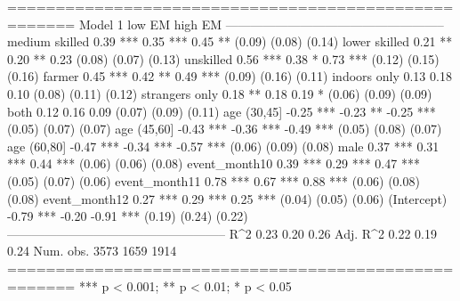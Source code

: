 
=====================================================
                Model 1      low EM       high EM    
-----------------------------------------------------
medium skilled     0.39 ***     0.35 ***     0.45 ** 
                  (0.09)       (0.08)       (0.14)   
lower skilled      0.21 **      0.20 **      0.23    
                  (0.08)       (0.07)       (0.13)   
unskilled          0.56 ***     0.38 *       0.73 ***
                  (0.12)       (0.15)       (0.16)   
farmer             0.45 ***     0.42 **      0.49 ***
                  (0.09)       (0.16)       (0.11)   
indoors only       0.13         0.18         0.10    
                  (0.08)       (0.11)       (0.12)   
strangers only     0.18 **      0.18         0.19 *  
                  (0.06)       (0.09)       (0.09)   
both               0.12         0.16         0.09    
                  (0.07)       (0.09)       (0.11)   
age (30,45]       -0.25 ***    -0.23 **     -0.25 ***
                  (0.05)       (0.07)       (0.07)   
age (45,60]       -0.43 ***    -0.36 ***    -0.49 ***
                  (0.05)       (0.08)       (0.07)   
age (60,80]       -0.47 ***    -0.34 ***    -0.57 ***
                  (0.06)       (0.09)       (0.08)   
male               0.37 ***     0.31 ***     0.44 ***
                  (0.06)       (0.06)       (0.08)   
event_month10      0.39 ***     0.29 ***     0.47 ***
                  (0.05)       (0.07)       (0.06)   
event_month11      0.78 ***     0.67 ***     0.88 ***
                  (0.06)       (0.08)       (0.08)   
event_month12      0.27 ***     0.29 ***     0.25 ***
                  (0.04)       (0.05)       (0.06)   
(Intercept)       -0.79 ***    -0.20        -0.91 ***
                  (0.19)       (0.24)       (0.22)   
-----------------------------------------------------
R^2                0.23         0.20         0.26    
Adj. R^2           0.22         0.19         0.24    
Num. obs.       3573         1659         1914       
=====================================================
*** p < 0.001; ** p < 0.01; * p < 0.05
